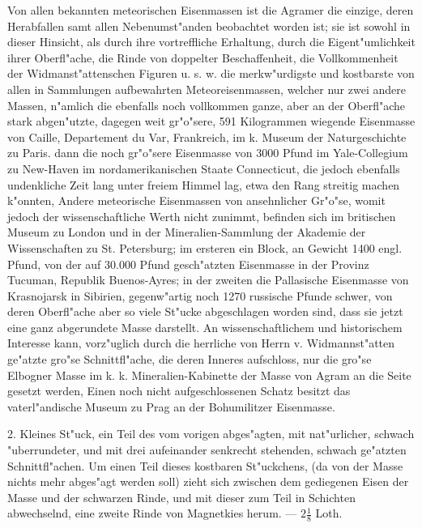 \documentclass[a4paper, 11pt, oneside, polutonikogreek, german]{article}
\begin{document}
{\footnotesize Von allen bekannten meteorischen Eisenmassen ist die Agramer die einzige, deren Herabfallen samt allen Nebenumst"anden beobachtet worden ist; sie ist sowohl in dieser Hinsicht, als durch ihre vortreffliche Erhaltung, durch die Eigent"umlichkeit ihrer Oberfl"ache, die Rinde von doppelter Beschaffenheit, die Vollkommenheit der Widmanst"attenschen Figuren u. s. w. die merkw"urdigste und kostbarste von allen in Sammlungen aufbewahrten Meteoreisenmassen, welcher nur zwei andere Massen, n"amlich die ebenfalls noch vollkommen ganze, aber an der Oberfl"ache stark abgen"utzte, dagegen weit gr"o"sere, 591 Kilogrammen wiegende Eisenmasse von Caille, Departement du Var, Frankreich, im k. Museum der Naturgeschichte zu Paris. dann die noch gr"o"sere Eisenmasse von 3000 Pfund im Yale-Collegium zu New-Haven im nordamerikanischen Staate Connecticut, die jedoch ebenfalls undenkliche Zeit lang unter freiem Himmel lag, etwa den Rang streitig machen k"onnten, Andere meteorische Eisenmassen von ansehnlicher Gr"o"se, womit jedoch der wissenschaftliche Werth nicht zunimmt, befinden sich im britischen Museum zu London und in der Mineralien-Sammlung der Akademie der Wissenschaften zu St. Petersburg; im ersteren ein Block, an Gewicht 1400 engl. Pfund, von der auf 30.000 Pfund gesch"atzten Eisenmasse in der Provinz Tucuman, Republik Buenos-Ayres; in der zweiten die Pallasische Eisenmasse von Krasnojarsk in Sibirien, gegenw"artig noch 1270 russische Pfunde schwer, von deren Oberfl"ache aber so viele St"ucke abgeschlagen worden sind, dass sie jetzt eine ganz abgerundete Masse darstellt. An wissenschaftlichem und historischem Interesse kann, vorz"uglich durch die herrliche von Herrn v. Widmannst"atten ge"atzte gro"se Schnittfl"ache, die deren Inneres aufschloss, nur die gro"se Elbogner Masse im k. k. Mineralien-Kabinette der Masse von Agram an die Seite gesetzt werden, Einen noch nicht aufgeschlossenen Schatz besitzt das vaterl"andische Museum zu Prag an der Bohumilitzer Eisenmasse.}

\setlength{\leftskip}{0pt}
\setlength{\parindent}{20pt}

2. Kleines St"uck, ein Teil des vom vorigen abges"agten, mit nat"urlicher, schwach "uberrundeter, und mit drei aufeinander senkrecht stehenden, schwach ge"atzten Schnittfl"achen. Um einen Teil dieses kostbaren St"uckchens, (da von der Masse nichts mehr abges"agt werden soll) zieht sich zwischen dem gediegenen Eisen der Masse und der schwarzen Rinde, und mit dieser zum Teil in Schichten abwechselnd, eine zweite Rinde von Magnetkies herum. --- $\mathfrak{2\frac{1}{8}}$ Loth.
\end{document}
